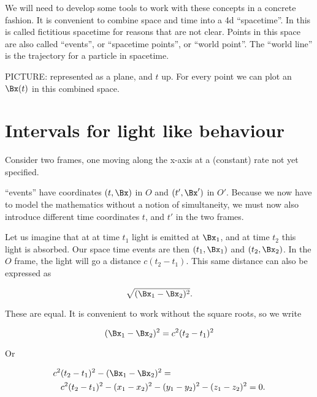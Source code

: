 %
%


We will need to develop some tools to work with these concepts in a concrete fashion.  It is convenient to combine space  and time  into a 4d ``spacetime''.  In \citep{landau1980classical} this is called fictitious spacetime for reasons that are not clear.  Points in this space are also called ``events'', or ``spacetime points'', or ``world point''.  The ``world line'' is the trajectory for a particle in spacetime.

PICTURE:  represented as a plane, and \(t\) up.  For every point we can plot an \(\Bx(t)\) in this combined space.

\section{Intervals for light like behaviour}

Consider two frames, one moving along the x-axis at a (constant) rate not yet specified.

``events'' have coordinates \((t, \Bx)\) in \(O\) and \((t', \Bx')\) in \(O'\).  Because we now have to model the mathematics without a notion of simultaneity, we must now also introduce different time coordinates \(t\), and \(t'\) in the two frames.  

Let us imagine that at at time \(t_1\) light is emitted at \(\Bx_1\), and at time \(t_2\) this light is absorbed.  Our space time events are then \((t_1, \Bx_1)\) and \((t_2, \Bx_2)\).  In the \(O\) frame, the light will go a distance \(c(t_2 - t_1)\).  This same distance can also be expressed as

\begin{equation}\label{eqn:relativisticElectrodynamicsL2:10}
\sqrt{ (\Bx_1 - \Bx_2)^2}.
\end{equation}

These are equal.  It is convenient to work without the square roots, so we write

\begin{equation}\label{eqn:relativisticElectrodynamicsL2:20}
(\Bx_1 - \Bx_2)^2 = c^2 (t_2 - t_1)^2
\end{equation}

Or

\begin{equation}\label{eqn:relativisticElectrodynamicsL2:30}
\begin{aligned}
c^2 &(t_2 - t_1)^2 - (\Bx_1 - \Bx_2)^2 = \\
&c^2 (t_2 - t_1)^2 
- (x_1 - x_2)^2
- (y_1 - y_2)^2
- (z_1 - z_2)^2 = 0.
\end{aligned}
\end{equation}

